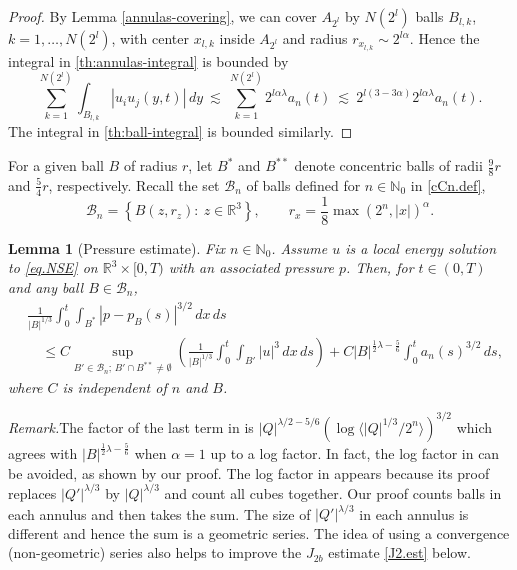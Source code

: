 \documentclass[11pt]{article}
\numberwithin{equation}{section}
\newtheorem{lem}[thm]{Lemma}
\theoremstyle{remark}
\theoremstyle{definition}
\newcommand{\bke}[1]{\left ( #1 \right )}
\newcommand{\bket}[1]{\left \{ #1 \right \}}
\newcommand{\cB}{\mathcal{B}}
\newcommand{\R}{\mathbb{R}}
\newcommand{\lec}{{\ \lesssim \ }}
\newcommand{\bka}[1]{{\langle #1 \rangle}}
\newcommand\al{\alpha}
\newcommand\la{\lambda}
\newcommand{\NN}{\mathbb{N}}
\newcommand{\Eq}[1]{\begin{equation*} #1 \end{equation*}}
\newcommand{\EQS}[1]{\begin{equation}\begin{split} #1 \end{split}\end{equation}}
\begin{document}
\begin{proof}
By Lemma \ref{annulas-covering}, we can cover $A_{2^l}$ by $N(2^l)$ balls $B_{l,k}$, $k=1,\ldots,N(2^l)$, with center $x_{l,k}$ inside $A_{2^l}$ and radius $r_{x_{l,k}}\sim 2^{l\al}$. Hence the integral in \eqref{th:annulas-integral} is bounded by
\[
\sum_{k=1}^{N(2^l)}   \int_{B_{l,k}}   |u_iu_j(y,t)|\,dy
 \lec  \sum_{k=1}^{N(2^l)}   2^{l\al \la} a_n(t)
\lec    2^{l(3-3\al)}  2^{l\al \la} a_n(t) .
\]
The integral in \eqref{th:ball-integral} is bounded similarly.
\end{proof}
For a given ball $B$ of radius $r$, let $B^*$ and $B^{**}$ denote concentric balls of radii $\frac 98r$ and $\frac 54r$, respectively.
 Recall the set $\cB_n$ of balls defined for $n \in \NN_0$ in \eqref{cCn.def},
\Eq{
\cB_n = \bket{ B(z,r_z): \ z \in \R^3} ,\qquad r_x=\frac18\max(2^n,|x|)^{\al}.
}
\begin{lem}[Pressure estimate]\label{lemma.pressure}
%
Fix $n\in \NN_0$. %
%
 Assume $u$ is a local energy solution to \eqref{eq.NSE} on $\R^3\times [0,T)$
with an associated pressure $p$.
Then, for $t\in(0,T)$ and any ball $B\in \cB_n$,
\EQS{
\label{EB09}
&\frac 1 {|B|^{1/3}} \int_0^t \int_{B^*} |p-p_B(s) |^{3/2}\,dx\,ds
\\& \quad
\leq
C \sup_{B'\in \cB_n ; \, B'\cap B^{**}\neq \emptyset} \bke{\frac 1 {|B|^{1/3}} \int_0^t \int_{B'} |u|^3\,dx\,ds}
%
+ C
 |B|^{\frac 12\la -\frac 56}
%
\int_0^t  a_n(s)^{3/2} \,ds,
}
where $C$ is independent of $n$ and $B$.
\end{lem}
\emph{Remark.}\quad The factor of the last term in \cite[Lemma 3.1]{BKT} is $ |Q|^{\la/2-5/6} (\log \bka{|Q|^{1/3}/2^n})^{3/2 }$
which agrees with $ |B|^{\frac 12\la -\frac 56}$ when $\al=1$ up to a log factor.
In fact, the  log factor in \cite{BKT} can be avoided, as shown by our proof. The log factor in \cite{BKT}
appears because its proof replaces $|Q'|^{\la/3}$ by $|Q|^{\la/3}$ and count all cubes together. Our proof counts balls in each annulus and then takes the sum. The size of $|Q'|^{\la/3}$ in each annulus is different and hence the sum is a geometric series. The idea of using a convergence (non-geometric) series also helps to improve the $J_{2b}$ estimate \eqref{J2.est} below.
\end{document}
